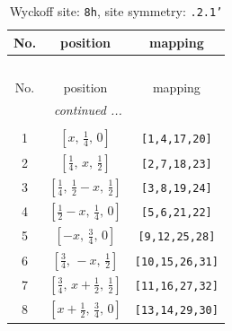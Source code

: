 \documentclass[fleqn,8pt]{jsarticle}
\begin{document}
\begin{longtable}{ccc}
\caption{Wyckoff site: {\tt 8h}, site symmetry: {\tt .2.1'}}
 \\
 \hline \hline
No. & position & mapping \\ \hline \endfirsthead

\multicolumn{2}{l}{\tablename\ \thetable{}} \\
 \hline \hline
No. & position & mapping \\ \hline \endhead

 \hline \hline
\multicolumn{2}{r}{\footnotesize\it continued ...} \\ \endfoot

 \hline \hline
\multicolumn{2}{r}{} \\ \endlastfoot

1 & $\left[ x,\, \frac{1}{4},\, 0 \right]$ & {\tt [1,4,17,20]} \\ \hline
2 & $\left[ \frac{1}{4},\, x,\, \frac{1}{2} \right]$ & {\tt [2,7,18,23]} \\ \hline
3 & $\left[ \frac{1}{4},\, \frac{1}{2} - x,\, \frac{1}{2} \right]$ & {\tt [3,8,19,24]} \\ \hline
4 & $\left[ \frac{1}{2} - x,\, \frac{1}{4},\, 0 \right]$ & {\tt [5,6,21,22]} \\ \hline
5 & $\left[ - x,\, \frac{3}{4},\, 0 \right]$ & {\tt [9,12,25,28]} \\ \hline
6 & $\left[ \frac{3}{4},\, - x,\, \frac{1}{2} \right]$ & {\tt [10,15,26,31]} \\ \hline
7 & $\left[ \frac{3}{4},\, x + \frac{1}{2},\, \frac{1}{2} \right]$ & {\tt [11,16,27,32]} \\ \hline
8 & $\left[ x + \frac{1}{2},\, \frac{3}{4},\, 0 \right]$ & {\tt [13,14,29,30]} \\
\end{longtable}
\renewcommand{\arraystretch}{1.2}
\end{document}
